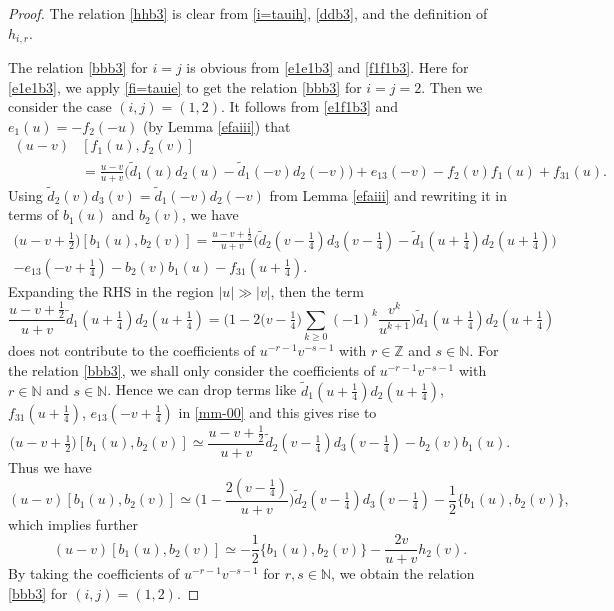 \documentclass[10pt,a4paper]{amsart}
\newcommand{\bN}{\mathbb{N}}
\newcommand{\bZ}{\mathbb{Z}}
\newcommand{\beq}{\begin{equation}}
\newcommand{\eeq}{\end{equation}}
\newcommand{\gge}{\geqslant}
\newcommand{\tl}{\tilde}
\begin{document}
\begin{proof}
The relation \eqref{hhb3} is clear from \eqref{i=tauih}, \eqref{ddb3}, and the definition of $h_{i,r}$.

The relation \eqref{bbb3} for $i=j$ is obvious from \eqref{e1e1b3} and \eqref{f1f1b3}. Here for \eqref{e1e1b3}, we apply \eqref{fi=tauie} to get the relation \eqref{bbb3} for $i=j=2$. Then we consider the case $(i,j)=(1,2)$. It follows from \eqref{e1f1b3} and $e_1(u)=-f_2(-u)$ (by Lemma \ref{efaiii}) that
\begin{align*}
(u-v)&[f_1(u),f_2(v)]\\
&=\frac{u-v}{u+v}\big(\tl d_1(u)d_2(u)-\tl d_1(-v)d_2(-v)\big)+e_{13}(-v)-f_2(v)f_1(u)+f_{31}(u).
\end{align*}
Using $\tl d_2(v)d_3(v)=\tl d_1(-v)d_2(-v)$ from Lemma \ref{efaiii} and rewriting it in terms of $b_1(u)$ and $b_2(v)$, we have
\beq\label{mm-00}
\begin{split}
\big(u-v+\tfrac12\big)[b_1(u),b_2(v)]
=\frac{u-v+\frac12}{u+v}\Big(\tl d_2(v-\tfrac14)d_3(v-\tfrac14)-\tl d_1(u+\tfrac14)d_2(u+\tfrac14)\Big)\\-e_{13}(-v+\tfrac14)-b_2(v)b_1(u)-f_{31}(u+\tfrac14).
\end{split}
\eeq
Expanding the RHS in the region $|u|\gg |v|$, then the term
\beq\label{996}
\frac{u-v+\frac12}{u+v} \tl d_1(u+\tfrac14)d_2(u+\tfrac14)=\Big(1-2\big(v-\tfrac14\big)\sum_{k\gge 0}(-1)^k\frac{v^k}{u^{k+1}}\Big)\tl d_1(u+\tfrac14)d_2(u+\tfrac14)
\eeq
does not contribute to the coefficients of $u^{-r-1}v^{-s-1}$ with $r\in\bZ$ and $s\in \bN$. For the relation \eqref{bbb3}, we shall only consider the coefficients of $u^{-r-1}v^{-s-1}$ with $r\in\bN$ and $s\in \bN$. Hence we can drop terms like $\tl d_1(u+\tfrac14)d_2(u+\tfrac14)$, $f_{31}(u+\tfrac14)$, $e_{13}(-v+\tfrac14)$ in \eqref{mm-00} and this gives rise to
\[
\big(u-v+\tfrac12\big)[b_1(u),b_2(v)]\simeq \frac{u-v+\frac12}{u+v} \tl d_2(v-\tfrac14)d_3(v-\tfrac14)-b_2(v)b_1(u).
\]
Thus we have
\[
(u-v)[b_1(u),b_2(v)]\simeq\Big(1-\frac{2( v-\tfrac14)}{u+v}\Big)\tl d_2(v-\tfrac14)d_3(v-\tfrac14)-\frac{1}{2}\big\{b_{1}(u),b_2(v)\big\},
\]
which implies further
\[
(u-v)[b_1(u),b_2(v)]\simeq -\frac{1}{2}\big\{b_1(u),b_2(v)\big\}-\frac{2v}{u+v} h_2(v).
\]
By taking the coefficients of $u^{-r-1}v^{-s-1}$ for $r,s\in\bN$, we obtain the relation \eqref{bbb3} for $(i,j)=(1,2)$.


\end{proof}
\end{document}
